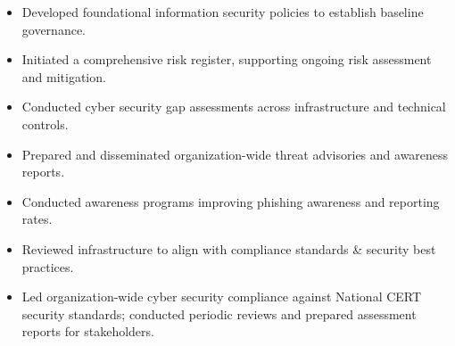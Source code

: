 \documentclass{resume}
\begin{document}
\begin{itemize}
\item {} Developed foundational information security policies to establish baseline governance.
\item {} Initiated a comprehensive risk register, supporting ongoing risk assessment and mitigation.
\item {} Conducted cyber security gap assessments across infrastructure and technical controls.
\item {} Prepared and disseminated organization-wide threat advisories and awareness reports.
\item {} Conducted awareness programs improving phishing awareness and reporting rates.
\item {} Reviewed infrastructure to align with compliance standards \& security best practices.
\item {} Led organization-wide cyber security compliance against National CERT security standards; conducted periodic reviews and prepared assessment reports for stakeholders.
\end{itemize}
\end{document}
